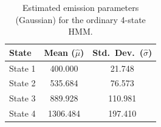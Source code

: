 \begin{table}[ht]
\centering
\begin{tabular}{lcc}
\hline
State & Mean ($\hat{\mu}$) & Std.\ Dev.\ ($\hat{\sigma}$) \\
\hline
State 1 & 400.000  &  21.748 \\
State 2 & 535.684  &  76.573 \\
State 3 & 889.928  & 110.981 \\
State 4 & 1306.484 & 197.410 \\
\hline
\end{tabular}
\caption{Estimated emission parameters (Gaussian) for the ordinary 4-state HMM.}
\label{tab:ordinary_hmm_emissions}
\end{table}

